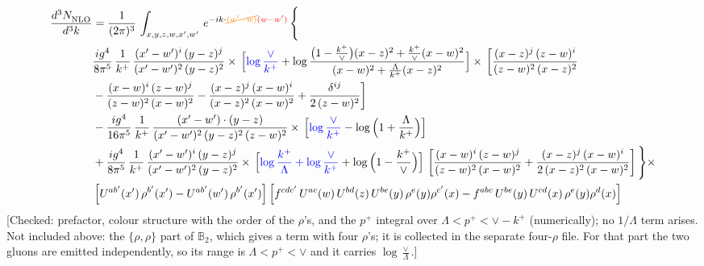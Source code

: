 \documentclass[9pt]{article}
\def\mf#1{\mathbb{#1}}
\numberwithin{equation}{section}
\begin{document}
\begin{align}
    \frac{d^{3}N_{\rm NLO}^{\rm}}{d^{3}k}  & =  \frac{1}{(2\pi)^{3}}\,
    \int_{x,y,z,w,x',w'}\,e^{-ik\cdot {\color{orange}\cancel{(w^\prime-w)}}{\color{red}(w-w^\prime)}}\,\Bigg\{\notag \\ & \frac{ig^{4}}{8\pi^{5}}\,\frac{1}{k^{+}}\,\frac{(x'-w')^{i}\,(y-z)^{j}}{(x'-w')^{2}\,(y-z)^{2}}\times\,\Big[{\color{blue}\log\frac{\vee}{k^{+}}}+\log\frac{\big(1-\frac{k^{+}}{\vee}\big)(x-z)^{2}+\frac{k^{+}}{\vee}(x-w)^{2}}{(x-w)^{2}+\frac{\Lambda}{k^{+}}(x-z)^{2}}\Big]\times\, \bigg[\frac{(x-z)^{j}\,(z-w)^{i}}{(z-w)^{2}\,(x-z)^{2}}\notag \\ & -\frac{(x-w)^{i}\,(z-w)^{j}}{(z-w)^{2}\,(x-w)^{2}}-\frac{(x-z)^{j}\,(x-w)^{i}}{(x-z)^{2}\,(x-w)^{2}}+\frac{\delta^{ij}}{2\,(z-w)^{2}}\bigg]\notag \\ & -\frac{ig^{4}}{16\pi^{5}}\,\frac{1}{k^{+}}\,\frac{(x'-w')\cdot (y-z)}{(x'-w')^{2}\,(y-z)^{2}\,(z-w)^{2}}\times\,\Big[{\color{blue}\log\frac{\vee}{k^{+}}}-\log\Big(1+\frac{\Lambda}{k^{+}}\Big)\Big]\notag \\ & + \frac{ig^{4}}{8\pi^{5}}\,\frac{1}{k^{+}}\,\frac{(x'-w')^{i}\,(y-z)^{j}}{(x'-w')^{2}\,(y-z)^{2}}\times\,\Big[{\color{blue}\log\frac{k^{+}}{\Lambda}+\log\frac{\vee}{k^{+}}}+\log\Big(1-\frac{k^{+}}{\vee}\Big)\Big]\,\left[\frac{(x-w)^{i}\,(z-w)^{j}}{(z-w)^{2}\,(x-w)^{2}}+\frac{(x-z)^{j}\,(x-w)^{i}}{2\, (x-z)^{2}\,(x-w)^{2}}\right] \Bigg\}\times\notag \\ &  \left[U^{ab'}(x')\,\rho^{b'}(x')-U^{ab'}(w')\,\rho^{b'}(x')\right] \left[f^{cdc'}\,U^{ac}(w)\,U^{bd}(z)\,U^{be}(y)\,\rho^{e}(y)\rho^{c'}(x)-f^{abc}\,U^{be}(y)\,U^{cd}(x)\,\rho^{e}(y)\rho^{d}(x)\right]
\end{align} {\color{red}[Checked: prefactor, colour structure with the order of the $\rho$'s, and the $p^+$ integral over $\Lambda<p^+<\vee-k^+$ (numerically); no $1/\Lambda$ term arises. Not included above: the $\{\rho,\rho\}$ part of $\mf{B}_2$, which gives a term with four $\rho$'s; it is collected in the separate four-$\rho$ file. For that part the two gluons are emitted independently, so its range is $\Lambda<p^+<\vee$ and it carries $\log\frac{\vee}{\Lambda}$.]}\par\noindent 
\end{document}
